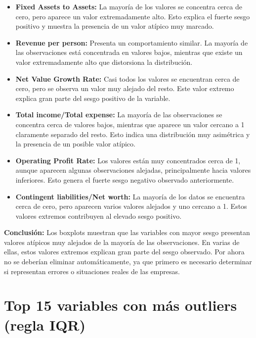 \documentclass[
]{book}
\providecommand{\tightlist}{%
  \setlength{\itemsep}{0pt}\setlength{\parskip}{0pt}}
\begin{document}
\begin{itemize}
\tightlist
\item
  \textbf{Fixed Assets to Assets:} La mayoría de los valores se concentra cerca de cero,
  pero aparece un valor extremadamente alto. Esto explica el fuerte sesgo positivo y
  muestra la presencia de un valor atípico muy marcado.
\item
  \textbf{Revenue per person:} Presenta un comportamiento similar. La mayoría de las
  observaciones está concentrada en valores bajos, mientras que existe un valor
  extremadamente alto que distorsiona la distribución.
\item
  \textbf{Net Value Growth Rate:} Casi todos los valores se encuentran cerca de cero, pero
  se observa un valor muy alejado del resto. Este valor extremo explica gran parte del
  sesgo positivo de la variable.
\item
  \textbf{Total income/Total expense:} La mayoría de las observaciones se concentra cerca
  de valores bajos, mientras que aparece un valor cercano a 1 claramente separado del
  resto. Esto indica una distribución muy asimétrica y la presencia de un posible
  valor atípico.
\item
  \textbf{Operating Profit Rate:} Los valores están muy concentrados cerca de 1, aunque
  aparecen algunas observaciones alejadas, principalmente hacia valores inferiores.
  Esto genera el fuerte sesgo negativo observado anteriormente.
\item
  \textbf{Contingent liabilities/Net worth:} La mayoría de los datos se encuentra cerca de
  cero, pero aparecen varios valores alejados y uno cercano a 1. Estos valores
  extremos contribuyen al elevado sesgo positivo.
\end{itemize}

\textbf{Conclusión:} Los boxplots muestran que las variables con mayor sesgo presentan
valores atípicos muy alejados de la mayoría de las observaciones. En varias de ellas,
estos valores extremos explican gran parte del sesgo observado. Por ahora no se
deberían eliminar automáticamente, ya que primero es necesario determinar si
representan errores o situaciones reales de las empresas.

\section{Top 15 variables con más outliers (regla IQR)}\label{top-15-variables-con-muxe1s-outliers-regla-iqr}
\end{document}
